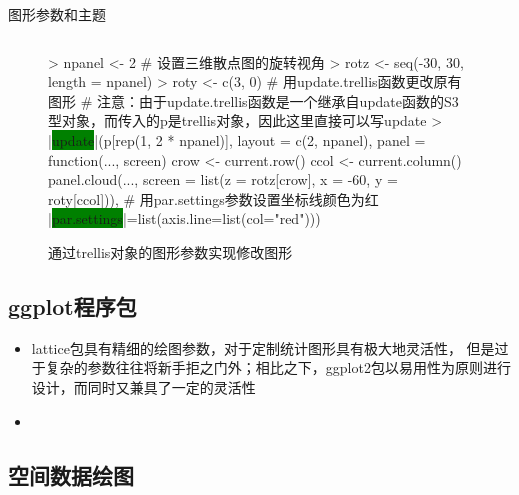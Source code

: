 \begin{frame}[t,fragile]{\subsecname}{图形参数和主题}
\begin{overlayarea}{\textwidth}{\textheight}
\begin{onlyenv}
\begin{figure}
\begin{columns}
    \begin{column}[c]{.6\textwidth}
\begin{rcode}
> npanel <- 2
# 设置三维散点图的旋转视角
> rotz <- seq(-30, 30, length = npanel)
> roty <- c(3, 0)
# 用update.trellis函数更改原有图形
# 注意：由于update.trellis函数是一个继承自update函数的S3型对象，而传入的p是trellis对象，因此这里直接可以写update
> |\colorbox{green}{update}|(p[rep(1, 2 * npanel)], 
         layout = c(2, npanel),
         panel = function(..., screen) {
           crow <- current.row()
           ccol <- current.column()
         panel.cloud(..., screen = list(z = rotz[crow], x = -60, y = roty[ccol]))},
         # 用par.settings参数设置坐标线颜色为红 
         |\colorbox{green}{par.settings}|=list(axis.line=list(col="red")))
\end{rcode}
    \end{column}
  \end{columns}
  \caption{通过trellis对象的图形参数实现修改图形}
\end{figure}
\end{onlyenv}
\end{overlayarea}
\end{frame}

\subsection{ggplot程序包}
\begin{frame}{\subsecname}{}
\begin{itemize}
\item lattice包具有精细的绘图参数，对于定制统计图形具有极大地灵活性，
但是过于复杂的参数往往将新手拒之门外；相比之下，ggplot2包以易用性为原则进行设计，而同时又兼具了一定的灵活性
\item 
\end{itemize}
\end{frame}

\subsection{空间数据绘图}
